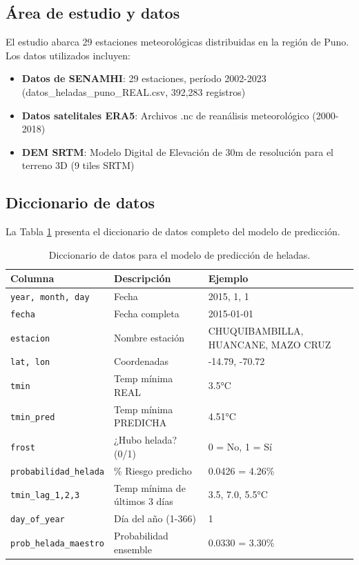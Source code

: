 \documentclass[11pt, a4paper]{article}
\begin{document}
\subsection{Área de estudio y datos}

El estudio abarca 29 estaciones meteorológicas distribuidas en la región de Puno. Los datos utilizados incluyen:

\begin{itemize}
    \item \textbf{Datos de SENAMHI}: 29 estaciones, período 2002-2023 (datos\_heladas\_puno\_REAL.csv, 392,283 registros)
    \item \textbf{Datos satelitales ERA5}: Archivos .nc de reanálisis meteorológico (2000-2018)
    \item \textbf{DEM SRTM}: Modelo Digital de Elevación de 30m de resolución para el terreno 3D (9 tiles SRTM)
\end{itemize}

\subsection{Diccionario de datos}

La Tabla \ref{tab:diccionario_heladas} presenta el diccionario de datos completo del modelo de predicción.

\begin{table}[h!]
\centering
\small
\renewcommand{\arraystretch}{1.4}
\setlength{\tabcolsep}{10pt}

\begin{tabular}{l p{6cm} p{5.5cm}}
\toprule
\rowcolor{headerblue!20}
\textbf{Columna} & \textbf{Descripción} & \textbf{Ejemplo} \\
\midrule
\texttt{year, month, day} & Fecha & 2015, 1, 1 \\
\rowcolor{lightgrey}
\texttt{fecha}            & Fecha completa & 2015-01-01 \\
\texttt{estacion}         & Nombre estación & CHUQUIBAMBILLA, HUANCANE, MAZO CRUZ \\
\rowcolor{lightgrey}
\texttt{lat, lon}         & Coordenadas & -14.79, -70.72 \\
\texttt{tmin}             & Temp mínima REAL & 3.5°C \\
\rowcolor{lightgrey}
\texttt{tmin\_pred}       & Temp mínima PREDICHA & 4.51°C \\
\texttt{frost}            & ¿Hubo helada? (0/1) & 0 = No, 1 = Sí \\
\rowcolor{lightgrey}
\texttt{probabilidad\_helada} & \% Riesgo predicho & 0.0426 = 4.26\% \\
\texttt{tmin\_lag\_1,2,3} & Temp mínima de últimos 3 días & 3.5, 7.0, 5.5°C \\
\rowcolor{lightgrey}
\texttt{day\_of\_year}    & Día del año (1-366) & 1 \\
\texttt{prob\_helada\_maestro} & Probabilidad ensemble & 0.0330 = 3.30\% \\
\bottomrule
\end{tabular}
\caption{Diccionario de datos para el modelo de predicción de heladas.}
\label{tab:diccionario_heladas}
\end{table}
\end{document}

